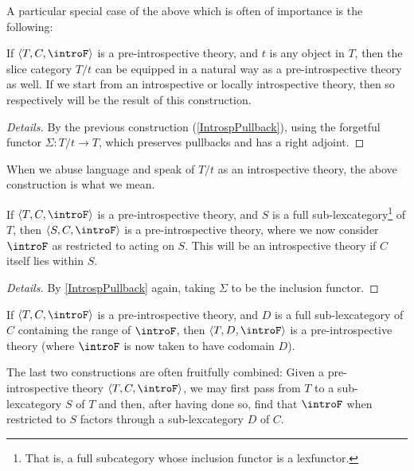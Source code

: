 A particular special case of the above which is often of importance is the following:

\begin{construction}\label{IntrospSlice}
If $\langle T, C, \introF \rangle$ is a pre-introspective theory, and $t$ is any object in $T$, then the slice category $T/t$ can be equipped in a natural way as a pre-introspective theory as well. If we start from an introspective or locally introspective theory, then so respectively will be the result of this construction.
\end{construction}
\begin{proof}[Details]
By the previous construction (\cref{IntrospPullback}), using the forgetful functor $\Sigma : T/t \to T$, which preserves pullbacks and has a right adjoint.
\end{proof}

When we abuse language and speak of $T/t$ as an introspective theory, the above construction is what we mean.

\begin{construction}\label{SubPreIntrosp}
If $\langle T, C, \introF \rangle$ is a pre-introspective theory, and $S$ is a full sub-lexcategory\footnote{That is, a full subcategory whose inclusion functor is a lexfunctor.} of $T$, then $\langle S, C, \introF \rangle$ is a pre-introspective theory, where we now consider $\introF$ as restricted to acting on $S$. This will be an introspective theory if $C$ itself lies within $S$.
\end{construction}
\begin{proof}[Details]
By \cref{IntrospPullback} again, taking $\Sigma$ to be the inclusion functor.
\end{proof}

\begin{construction}\label{SubCPreIntrosp}
If $\langle T, C, \introF \rangle$ is a pre-introspective theory, and $D$ is a full sub-lexcategory of $C$ containing the range of $\introF$, then $\langle T, D, \introF \rangle$ is a pre-introspective theory (where $\introF$ is now taken to have codomain $D$).
\end{construction}

The last two constructions are often fruitfully combined: Given a pre-introspective theory $\langle T, C, \introF \rangle$, we may first pass from $T$ to a sub-lexcategory $S$ of $T$ and then, after having done so, find that $\introF$ when restricted to $S$ factors through a sub-lexcategory $D$ of $C$.

